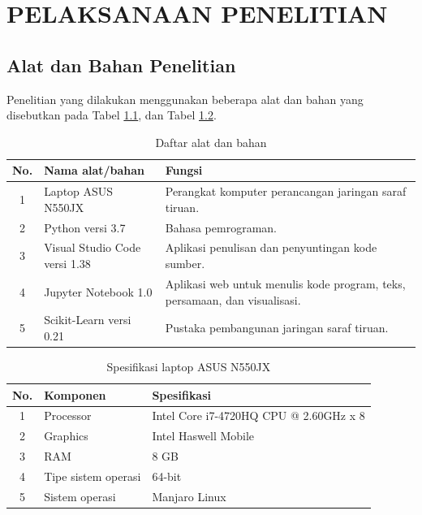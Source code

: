\chapter{PELAKSANAAN PENELITIAN}
\label{pelaksanaan-penelitian}

\section{Alat dan Bahan Penelitian}
Penelitian yang dilakukan menggunakan beberapa alat dan bahan yang disebutkan pada Tabel \ref{tbl:4:alatbahan}, dan Tabel \ref{tbl:4:speklaptop}.

\vspace{0em}
\begin{table}[!h]
	\caption{Daftar alat dan bahan}
	\label{tbl:4:alatbahan}
	\centering
	\begin{tabular}{|c|p{5cm}|p{8cm}|}
		\hline
		No. & Nama alat/bahan & Fungsi \\
		\hline
		1 & Laptop ASUS N550JX & Perangkat komputer perancangan jaringan saraf tiruan. \\
		\hline
		2 & Python versi 3.7 & Bahasa pemrograman. \\
		\hline
		3 & Visual Studio Code versi 1.38 & Aplikasi penulisan dan penyuntingan kode sumber. \\
		\hline
		4 & Jupyter Notebook 1.0 & Aplikasi web untuk menulis kode program, teks, persamaan, dan visualisasi. \\
		\hline
		5 & Scikit-Learn versi 0.21 & Pustaka pembangunan jaringan saraf tiruan. \\
		\hline
	\end{tabular}
\end{table}
\vspace{-1em}
\begin{table}[!h]
	\caption{Spesifikasi laptop ASUS N550JX}
	\label{tbl:4:speklaptop}
	\centering
	\begin{tabular}{|c|p{5cm}|p{8cm}|}
		\hline
		No. & Komponen & Spesifikasi \\ 
		\hline
		1 & Processor & Intel Core i7-4720HQ CPU @ 2.60GHz x 8 \\ 
		\hline
		2 & Graphics & Intel Haswell Mobile \\
		\hline
		3 & RAM & 8 GB \\ 
		\hline
		4 & Tipe sistem operasi & 64-bit \\
		\hline
		5 & Sistem operasi & Manjaro Linux \\ 
		\hline
	\end{tabular}
\end{table}

